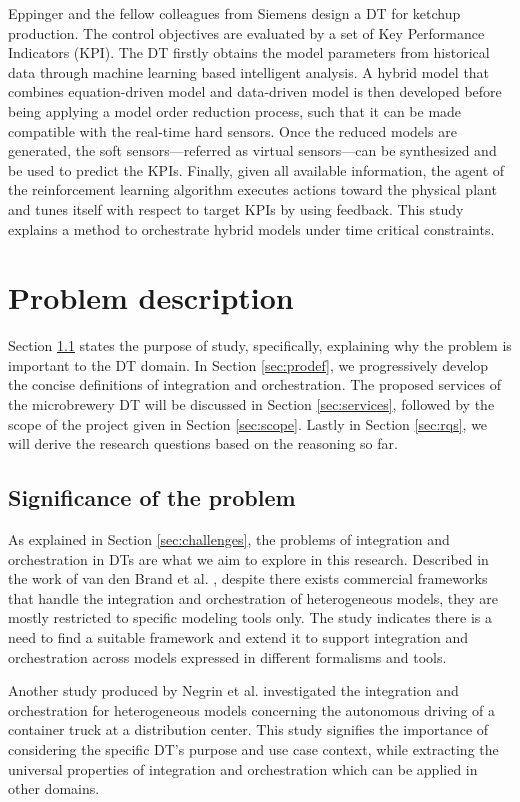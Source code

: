 \documentclass[journal,onecolumn]{IEEEtran} %
\begin{document}
Eppinger and the fellow colleagues from Siemens \cite{Eppinger2021} design a DT for ketchup production. The control objectives are evaluated by a set of Key Performance Indicators (KPI). The DT firstly obtains the model parameters from historical data through machine learning based intelligent analysis. A hybrid model that combines equation-driven model and data-driven model is then developed before being applying a model order reduction process, such that it can be made compatible with the real-time hard sensors. Once the reduced models are generated, the soft sensors---referred as virtual sensors---can be synthesized and be used to predict the KPIs. Finally, given all available information, the agent of the reinforcement learning algorithm executes actions toward the physical plant and tunes itself with respect to target KPIs by using feedback. This study explains a method to orchestrate hybrid models under time critical constraints. 

\pagebreak
\section{Problem description}
Section \ref{sec:sigpro} states the purpose of study, specifically, explaining why the problem is important to the DT domain. In Section \ref{sec:prodef}, we progressively develop the concise definitions of integration and orchestration. The proposed services of the microbrewery DT will be discussed in Section \ref{sec:services}, followed by the scope of the project given in Section \ref{sec:scope}. Lastly in Section \ref{sec:rqs}, we will derive the research questions based on the reasoning so far. 

\subsection{Significance of the problem}\label{sec:sigpro}
As explained in Section \ref{sec:challenges}, the problems of integration and orchestration in DTs are what we aim to explore in this research. Described in the work of van den Brand et al. \cite{brand2021}, despite there exists commercial frameworks that handle the integration and orchestration of heterogeneous models, they are mostly restricted to specific modeling tools only. The study indicates there is a need to find a suitable framework and extend it to support integration and orchestration across models expressed in different formalisms and tools. 

Another study produced by Negrin et al. \cite{Negrin2021} investigated the integration and orchestration for heterogeneous models concerning the autonomous driving of a container truck at a distribution center. This study signifies the importance of considering the specific DT's purpose and use case context, while extracting the universal properties of integration and orchestration which can be applied in other domains.
\end{document}
